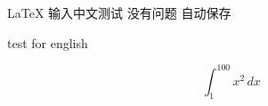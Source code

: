 \documentclass{article}
\begin{document}
\LaTeX{}
输入中文测试
没有问题
自动保存

test for english

$$
\int_{1}^{100} x^2 \,dx 
$$
\end{document}
